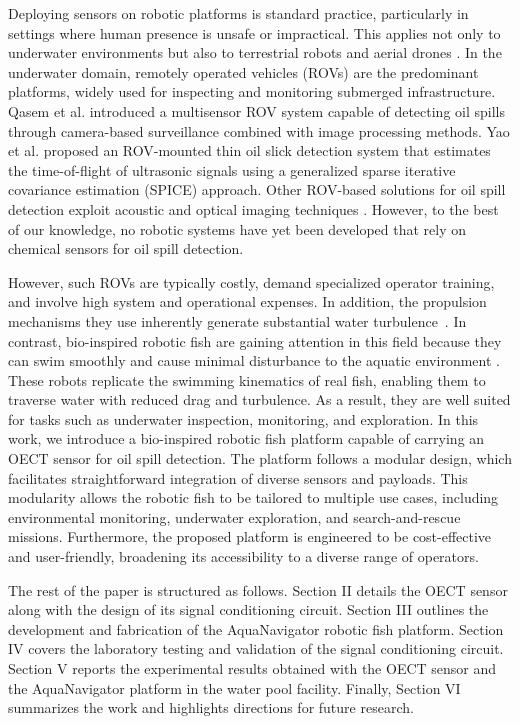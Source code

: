 \documentclass{iopjournal}
\begin{document}
Deploying sensors on robotic platforms is standard practice, particularly in settings where human presence is unsafe or impractical. This applies not only to underwater environments but also to terrestrial robots and aerial drones \cite{Yu2019}. In the underwater domain, remotely operated vehicles (ROVs) are the predominant platforms, widely used for inspecting and monitoring submerged infrastructure. Qasem et al. \cite{Qasem2019} introduced a multisensor ROV system capable of detecting oil spills through camera-based surveillance combined with image processing methods. Yao et al. \cite{Yao2024} proposed an ROV-mounted thin oil slick detection system that estimates the time-of-flight of ultrasonic signals using a generalized sparse iterative covariance estimation (SPICE) approach. Other ROV-based solutions for oil spill detection exploit acoustic and optical imaging techniques \cite{Pocwiardowski2021,Du2025}. However, to the best of our knowledge, no robotic systems have yet been developed that rely on chemical sensors for oil spill detection.

However, such ROVs are typically costly, demand specialized operator training, and involve high system and operational expenses. In addition, the propulsion mechanisms they use inherently generate substantial water turbulence~\cite{Capocci2017}. In contrast, bio-inspired robotic fish are gaining attention in this field because they can swim smoothly and cause minimal disturbance to the aquatic environment \cite{Marras2012, Polverino2013}. These robots replicate the swimming kinematics of real fish, enabling them to traverse water with reduced drag and turbulence. As a result, they are well suited for tasks such as underwater inspection, monitoring, and exploration. In this work, we introduce a bio-inspired robotic fish platform capable of carrying an OECT sensor for oil spill detection. The platform follows a modular design, which facilitates straightforward integration of diverse sensors and payloads. This modularity allows the robotic fish to be tailored to multiple use cases, including environmental monitoring, underwater exploration, and search-and-rescue missions. Furthermore, the proposed platform is engineered to be cost-effective and user-friendly, broadening its accessibility to a diverse range of operators.

The rest of the paper is structured as follows. Section II details the OECT sensor along with the design of its signal conditioning circuit. Section III outlines the development and fabrication of the AquaNavigator robotic fish platform. Section IV covers the laboratory testing and validation of the signal conditioning circuit. Section V reports the experimental results obtained with the OECT sensor and the AquaNavigator platform in the water pool facility. Finally, Section VI summarizes the work and highlights directions for future research.
\end{document}
